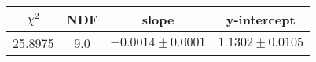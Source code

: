 \begin{tabular}{|c|c|c|c|}

\hline
$\chi^{2}$ & NDF & slope & y-intercept  \\
\hline
25.8975 & 9.0 & $-0.0014\pm0.0001$ & $1.1302\pm0.0105$ \\
\hline

\end{tabular}